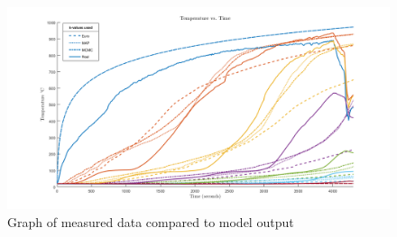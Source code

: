 \begin{figure}
	\label{final_graph}
	\centering
	\includegraphics[width=\linewidth,]{figures/final_graph.png}
	\caption{Graph of measured data compared to model output}
\end{figure}






